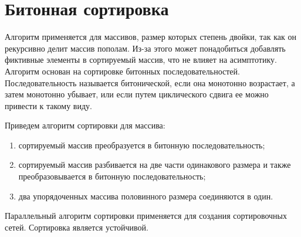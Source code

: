 \section{Битонная сортировка}

Алгоритм применяется для массивов, размер которых степень двойки, так как он рекурсивно делит массив пополам. Из-за этого может понадобиться добавлять фиктивные элементы в сортируемый массив, что не влияет на асимптотику. Алгоритм основан на сортировке битонных последовательностей. Последовательность называется битонической, если она монотонно возрастает, а затем монотонно убывает, или если путем циклического сдвига ее можно привести к такому виду. \cite{cormen} 

Приведем алгоритм сортировки для массива:
\begin{enumerate}
	\item сортируемый массив преобразуется в битонную последовательность;
	\item сортируемый массив разбивается на две части одинакового размера и также преобразовывается в битонную последовательность;
	\item два упорядоченных массива половинного размера соединяются в один.
\end{enumerate}
Параллельный алгоритм сортировки применяется для создания сортировочных сетей. Сортировка является устойчивой.